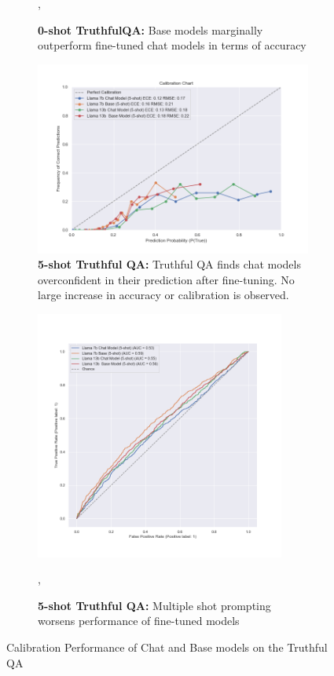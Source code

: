 \documentclass[11pt]{article}
\begin{document}
\begin{figure}
\begin{subfigure}[b]{0.38\textwidth}
         \caption{\textbf{0-shot TruthfulQA:} Base models marginally outperform fine-tuned chat models 
         in terms of accuracy},
         \label{fig:0-shot-truthful_qa-roc-roc}
    \end{subfigure} 
     \hfill
     \begin{subfigure}[b]{0.60\textwidth}
         \centering
         \includegraphics[width=1.0\textwidth]{figures/5-shot-TruthQA.png}
         \caption{\textbf{5-shot Truthful QA:} Truthful QA finds chat models overconfident in their prediction after fine-tuning. No large increase in accuracy or calibration is observed.}
         \label{fig:5-shot-TruthQA}
     \end{subfigure}    
     \hfill
    \begin{subfigure}[b]{0.38\textwidth}
         \centering \includegraphics[width=0.9\textwidth]{figures/5-shot-TruthfulQA-roc.png}
         \caption{\textbf{5-shot Truthful QA:}  Multiple shot prompting worsens performance of fine-tuned models},
         \label{fig:5-shot-TruthfulQA-roc}
    \end{subfigure} 
        \caption{Calibration Performance of Chat and Base models on the Truthful QA}
        \label{fig:5-shot-TruthfulQA}
\end{figure}
\end{document}
